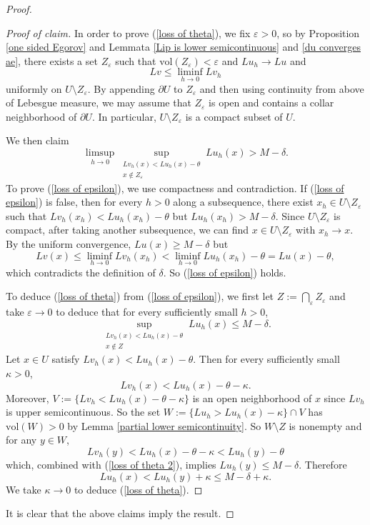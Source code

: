 \documentclass[reqno,11pt]{amsart}
\newcommand{\vol}{\mathrm{vol}}
\theoremstyle{definition}
\numberwithin{equation}{section}
\begin{document}
\begin{proof}
\begin{proof}[Proof of claim]
In order to prove (\ref{loss of theta}), we fix $\varepsilon > 0$, so by Proposition \ref{one sided Egorov} and Lemmata \ref{Lip is lower semicontinuous} and \ref{du converges ae}, there exists a set $Z_\varepsilon$ such that $\vol(Z_\varepsilon) < \varepsilon$ and $Lu_h \to Lu$ and 
$$Lv \leq \liminf_{h \to 0} Lv_h$$
uniformly on $U \setminus Z_\varepsilon$.
By appending $\partial U$ to $Z_\varepsilon$ and then using continuity from above of Lebesgue measure, we may assume that $Z_\varepsilon$ is open and contains a collar neighborhood of $\partial U$.
In particular, $U \setminus Z_\varepsilon$ is a compact subset of $U$.

We then claim 
\begin{equation}\label{loss of epsilon}
\limsup_{h \to 0} \sup_{\substack{Lv_h(x) < Lu_h(x) - \theta \\ x \notin Z_\varepsilon}} Lu_h(x) > M - \delta.
\end{equation}
To prove (\ref{loss of epsilon}), we use compactness and contradiction.
If (\ref{loss of epsilon}) is false, then for every $h > 0$ along a subsequence, there exist $x_h \in U \setminus Z_\varepsilon$ such that $Lv_h(x_h) < Lu_h(x_h) - \theta$ but $Lu_h(x_h) > M - \delta$.
Since $U \setminus Z_\varepsilon$ is compact, after taking another subsequence, we can find $x \in U \setminus Z_\varepsilon$ with $x_h \to x$.
By the uniform convergence, $Lu(x) \geq M - \delta$ but 
$$Lv(x) \leq \liminf_{h \to 0} Lv_h(x_h) < \liminf_{h \to 0} Lu_h(x_h) - \theta = Lu(x) - \theta,$$
which contradicts the definition of $\delta$.
So (\ref{loss of epsilon}) holds.

To deduce (\ref{loss of theta}) from (\ref{loss of epsilon}), we first let $Z := \bigcap_\varepsilon Z_\varepsilon$ and take $\varepsilon \to 0$ to deduce that for every sufficiently small $h > 0$,
\begin{equation}\label{loss of theta 2}
\sup_{\substack{Lv_h(x) < Lu_h(x) - \theta \\ x \notin Z}} Lu_h(x) \leq M - \delta.
\end{equation}
Let $x \in U$ satisfy $Lv_h(x) < Lu_h(x) - \theta$.
Then for every sufficiently small $\kappa > 0$,
$$Lv_h(x) < Lu_h(x) - \theta - \kappa.$$
Moreover, $V := \{Lv_h < Lu_h(x) - \theta - \kappa\}$ is an open neighborhood of $x$ since $Lv_h$ is upper semicontinuous.
So the set $W := \{Lu_h > Lu_h(x) - \kappa\} \cap V$ has $\vol(W) > 0$ by Lemma \ref{partial lower semicontinuity}.
So $W \setminus Z$ is nonempty and for any $y \in W$,
$$Lv_h(y) < Lu_h(x) - \theta - \kappa < Lu_h(y) - \theta$$
which, combined with (\ref{loss of theta 2}), implies $Lu_h(y) \leq M - \delta$.
Therefore
$$Lu_h(x) < Lu_h(y) + \kappa \leq M - \delta + \kappa.$$
We take $\kappa \to 0$ to deduce (\ref{loss of theta}).
\end{proof}

It is clear that the above claims imply the result.
\end{proof}
\end{document}
